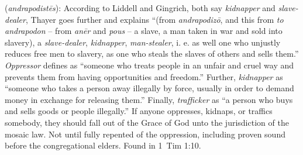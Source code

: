 \item[Oppressor,]

(\textit{andrapodistēs}):
According to Liddell and Gingrich, both say \emph{kidnapper} and \emph{slave-dealer}, Thayer goes further and explains ``(from \emph{andrapodizō}, and this from \emph{to andrapodon} -- from \emph{anēr} and \emph{pous} -- a slave, a man taken in war and sold into slavery), a \emph{slave-dealer}, \emph{kidnapper}, \emph{man-stealer}, i. e. as well one who unjustly reduces free men to slavery, as one who steals the slaves of others and sells them.'' 
\emph{Oppressor} defines as ``someone who treats people in an unfair and cruel way and prevents them from having opportunities and freedom.'' 
Further, \emph{kidnapper} as ``someone who takes a person away illegally by force, usually in order to demand money in exchange for releasing them.'' 
Finally, \emph{trafficker} as ``a person who buys and sells goods or people illegally.'' If anyone oppresses, kidnaps, or traffics somebody, they should fall out of the Grace of God unto the jurisdiction of the mosaic law. Not until fully repented of the oppression, including proven sound before the congregational elders.
Found in 1~Tim 1:10.
